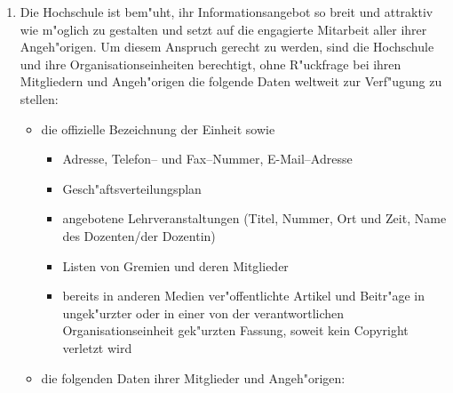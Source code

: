 \documentclass[12pt,titlepage,twoside]{scrartcl}
\begin{document}
\begin{appendix}
\begin{enumerate}
  \item Die Hochschule ist bem"uht, ihr Informationsangebot so breit
        und attraktiv wie m"oglich zu gestalten und setzt auf die
        engagierte Mitarbeit aller ihrer Angeh"origen. Um diesem
        Anspruch gerecht zu werden, sind die Hochschule und ihre
        Organisationseinheiten berechtigt, ohne R"uckfrage bei
        ihren Mitgliedern und Angeh"origen die folgende Daten
        weltweit zur Verf"ugung zu stellen:
        \begin{itemize}
          \item die offizielle Bezeichnung der Einheit sowie
                \begin{itemize}
                  \item Adresse, Telefon-- und Fax--Nummer, E-Mail--Adresse
                  \item Gesch"aftsverteilungsplan
                  \item angebotene Lehrveranstaltungen (Titel, Nummer,
                        Ort und Zeit, Name des Dozenten/der Dozentin)
                  \item Listen von Gremien und deren Mitglieder
                  \item bereits in anderen Medien ver"offentlichte
                        Artikel und Beitr"age in ungek"urzter
                        oder in einer von der verantwortlichen
                        Organisationseinheit gek"urzten Fassung,
                        soweit kein Copyright verletzt wird
                \end{itemize}
          \item die folgenden Daten ihrer Mitglieder und Angeh"origen:
        \end{itemize}


\end{enumerate}
\end{appendix}
\end{document}
